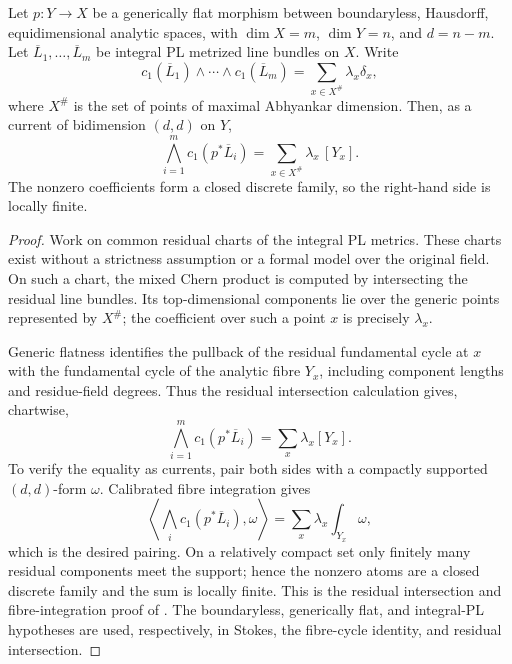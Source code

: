\begin{theorem}
\label{thm:cld-relative-ma}
Let $p:Y\to X$ be a generically flat morphism between boundaryless,
Hausdorff, equidimensional analytic spaces, with
$\dim X=m$, $\dim Y=n$, and $d=n-m$.  Let
$\overline L_1,\ldots,\overline L_m$ be integral PL metrized line bundles
on $X$.  Write
\[
 c_1(\overline L_1)\wedge\cdots\wedge c_1(\overline L_m)
       =\sum_{x\in X^\#}\lambda_x\delta_x,
\]
where $X^\#$ is the set of points of maximal Abhyankar dimension.  Then,
as a current of bidimension $(d,d)$ on $Y$,
\[
 \bigwedge_{i=1}^m c_1(p^*\overline L_i)
        =\sum_{x\in X^\#}\lambda_x\,[Y_x].
\]
The nonzero coefficients form a closed discrete family, so the right-hand
side is locally finite.
\end{theorem}
\begin{proof}
Work on common residual charts of the integral PL metrics.  These charts
exist without a strictness assumption or a formal model over the original
field.  On such a chart, the mixed Chern
product is computed by intersecting the residual line bundles.  Its
top-dimensional components lie over the generic points represented by
$X^\#$; the coefficient over such a point $x$ is precisely $\lambda_x$.

Generic flatness identifies the pullback of the residual fundamental cycle
at $x$ with the fundamental cycle of the analytic fibre $Y_x$, including
component lengths and residue-field degrees.  Thus the residual intersection
calculation gives, chartwise,
\[
       \bigwedge_{i=1}^m c_1(p^*\overline L_i)
          =\sum_x\lambda_x[Y_x].
\]
To verify the equality as currents, pair both sides with a compactly
supported $(d,d)$-form $\omega$.  Calibrated fibre integration gives
\[
 \left\langle\bigwedge_i c_1(p^*\overline L_i),\omega\right\rangle
   =\sum_x\lambda_x\int_{Y_x}\omega,
\]
which is the desired pairing.  On a relatively compact set only finitely
many residual components meet the support; hence the nonzero atoms are a
closed discrete family and the sum is locally finite.  This is the residual
intersection and fibre-integration proof of \cite[\S18.6]{CLD25}.
The boundaryless, generically flat, and integral-PL hypotheses are used,
respectively, in Stokes, the fibre-cycle identity, and residual
intersection.
\end{proof}

